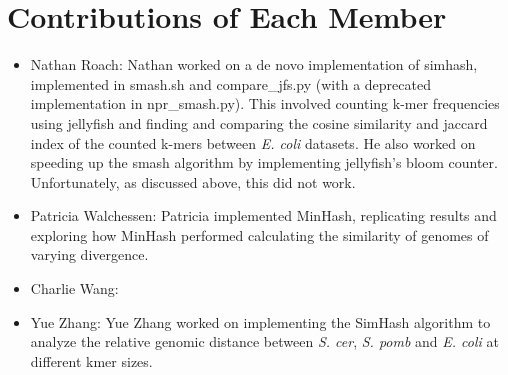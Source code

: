 \documentclass[12pt, letterpaper]{article}
\begin{document}
\section{Contributions of Each Member}
\begin{itemize}
\item Nathan Roach: Nathan worked on a de novo implementation of simhash, implemented in smash.sh and compare\_jfs.py (with a deprecated implementation in npr\_smash.py). This involved counting k-mer frequencies using jellyfish and finding and comparing the cosine similarity and jaccard index of the counted k-mers between \textit{E. coli} datasets. He also worked on speeding up the smash algorithm by implementing jellyfish's bloom counter. Unfortunately, as discussed above, this did not work.
\item Patricia Walchessen: Patricia implemented MinHash, replicating results and exploring how MinHash performed calculating the similarity of genomes of varying divergence.
\item Charlie Wang: 
\item Yue Zhang: Yue Zhang worked on implementing the SimHash algorithm to analyze the relative genomic distance between \textit{S. cer}, \textit{S. pomb} and \textit{E. coli} at different kmer sizes.
\end{itemize}
\end{document}
